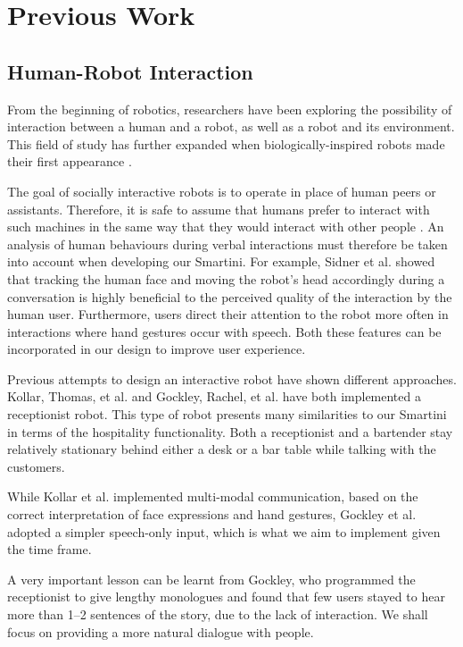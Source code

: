 \documentclass[conference]{IEEEtran}
\begin{document}
\section{Previous Work}

\subsection{Human-Robot Interaction}

From the beginning of robotics, researchers have been exploring the possibility of interaction between a human and a robot, as well as a robot and its environment. This field of study has further expanded when biologically-inspired robots made their first appearance \cite{socialBots}.

The goal of socially interactive robots is to operate in place of human peers or assistants. Therefore, it is safe to assume that humans prefer to interact with such machines in the same way that they would interact with other people \cite{socialBots}. An analysis of human behaviours during verbal interactions must therefore be taken into account when developing our Smartini. For example, Sidner et al. \cite{engagement} showed that tracking the human face and moving the robot's head accordingly during a conversation is highly beneficial to the perceived quality of the interaction by the human user. Furthermore, users direct their attention to the robot more often in interactions where hand gestures occur with speech. Both these features can be incorporated in our design to improve  user experience. 

Previous attempts to design an interactive robot have shown different approaches. Kollar, Thomas, et al. \cite{mmodal} and Gockley, Rachel, et al. \cite{valeria} have both implemented a receptionist robot. This type of robot presents many similarities to our Smartini in terms of the hospitality functionality. Both a receptionist and a bartender stay relatively stationary behind either a desk or a bar table while talking with the customers. 

While Kollar et al. implemented multi-modal communication, based on the correct interpretation of face expressions and hand gestures, Gockley et al. adopted a simpler speech-only input, which is what we aim to implement given the time frame. 

A very important lesson can be learnt from Gockley, who programmed the receptionist to give lengthy monologues and found that few users stayed to hear more than 1–2 sentences of the story, due to the lack of interaction. We shall focus on providing a more natural dialogue with people.
\end{document}
